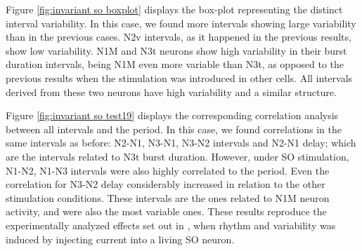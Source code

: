 Figure \ref{fig:invariant so boxplot} displays the box-plot representing the distinct interval variability. In this case, we found more intervals showing large variability than in the previous cases. N2v intervals, as it happened in the previous results, show low variability. %
N1M and N3t neurons show high variability in their burst duration intervals, being N1M even more variable than N3t, as opposed to the previous results when the stimulation was introduced in other cells. All intervals derived from these two neurons have high variability and a similar structure. %




Figure \ref{fig:invariant so test19} displays the corresponding correlation analysis between all intervals and the period. %
In this case, we found correlations in the same intervals as before: N2-N1, N3-N1, N3-N2 intervals and N2-N1 delay; which are the intervals related to N3t burst duration. However, under SO stimulation,  N1-N2, N1-N3 intervals were also highly correlated to the period. Even the correlation for N3-N2 delay considerably increased in relation to the other stimulation conditions. These intervals are the ones related to N1M neuron activity, and were also the most variable ones.  These results reproduce the experimentally analyzed effects set out in \cite{Elliott1991}, when rhythm and variability was induced by injecting current into a living SO neuron.


